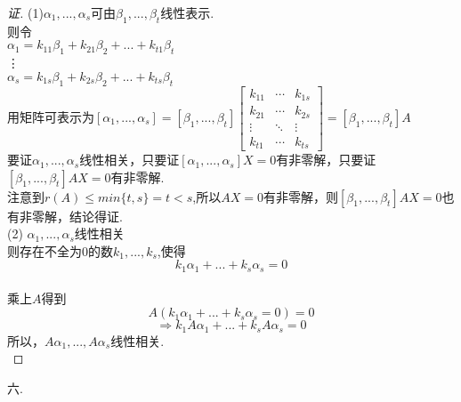 \documentclass[10pt,a4paper]{report}
\begin{document}
\begin{proof}[证]
	(1)$\alpha_{1},...,\alpha_{s}$可由$\beta_{1},...,\beta_{t}$线性表示.\\
	则令\\
	$\alpha_{1} = k_{11}\beta_{1}+k_{21}\beta_{2}+...+k_{t1}\beta_{t}$\\
	\vdots\\
	$\alpha_{s} = k_{1s}\beta_{1}+k_{2s}\beta_{2}+...+k_{ts}\beta_{t}$\\
	用矩阵可表示为$[\alpha_{1},...,\alpha_{s}] = [\beta_{1},...,\beta_{t}]\left[
	\begin{matrix}
	k_{11} & \cdots & k_{1s}\\
	k_{21} & \cdots & k_{2s}\\
	\vdots & \ddots & \vdots\\
	k_{t1} & \cdots & k_{ts}
	\end{matrix}
	\right] = [\beta_{1},...,\beta_{t}]A$\\
	要证$\alpha_{1},...,\alpha_{s}$线性相关，只要证$[\alpha_{1},...,\alpha_{s}]X=0$有非零解，只要证$[\beta_{1},...,\beta_{t}]AX = 0$有非零解.\\
	注意到$r(A) \leq min\{t, s\} = t < s$,所以$AX=0$有非零解，则$[\beta_{1},...,\beta_{t}]AX = 0$也有非零解，结论得证.\\
	(2) $\alpha_{1},...,\alpha_{s}$线性相关\\
	则存在不全为0的数$k_{1},...,k_{s}$,使得\\
	$$k_{1}\alpha_{1}+...+k_{s}\alpha_{s}=0$$\\
	乘上$A$得到\\
	$$A(k_{1}\alpha_{1}+...+k_{s}\alpha_{s}=0)=0$$
	$$\Rightarrow{} k_{1}A\alpha_{1}+...+k_{s}A\alpha_{s}=0$$
	所以，$A\alpha_{1},...,A\alpha_{s}$线性相关.\\
\end{proof}
\noindent 六.
\end{document}
